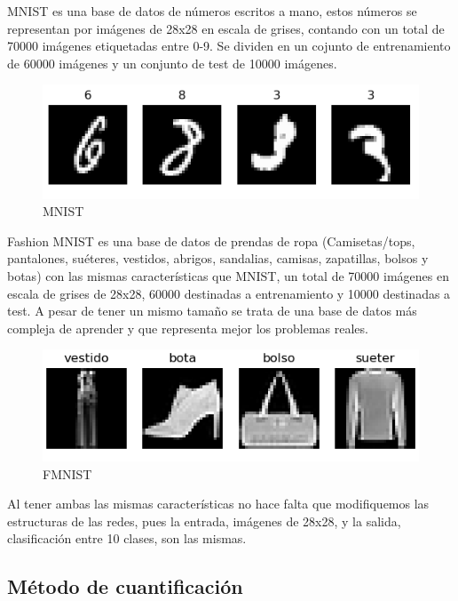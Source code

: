 MNIST es una base de datos de números escritos a mano, estos números se representan por imágenes de 28x28 en escala de grises, contando con un total de 70000 imágenes etiquetadas entre 0-9. Se dividen en un cojunto de entrenamiento de 60000 imágenes y un conjunto de test de 10000 imágenes.

\begin{figure}[H]
    \centering
    \includegraphics[width=1\textwidth]{imagenes/mnist.png}
    \caption{MNIST}
\end{figure}

Fashion MNIST es una base de datos de prendas de ropa (Camisetas/tops, pantalones, suéteres, vestidos, abrigos, sandalias, camisas, zapatillas, bolsos y botas) con las mismas características que MNIST, un total de 70000 imágenes en escala de grises de 28x28, 60000 destinadas a entrenamiento y 10000 destinadas a test. A pesar de tener un mismo tamaño se trata de una base de datos más compleja de aprender y que representa mejor los problemas reales.

\begin{figure}[H]
    \centering
    \includegraphics[width=1\textwidth]{imagenes/fmnist.png}
    \caption{FMNIST}
\end{figure}

Al tener ambas las mismas características no hace falta que modifiquemos las estructuras de las redes, pues la entrada, imágenes de 28x28, y la salida, clasificación entre 10 clases, son las mismas.

\subsection{Método de cuantificación}

